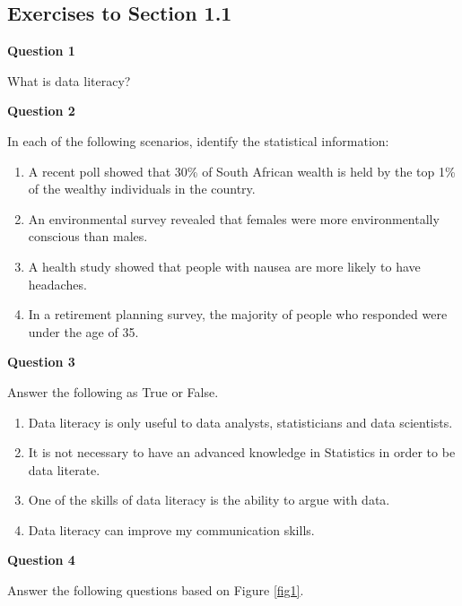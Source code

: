 \documentclass[
]{book}
\begin{document}
\subsection{Exercises to Section 1.1}\label{exercises-to-section-1.1}

\textbf{Question 1}

What is data literacy?

\textbf{Question 2}

In each of the following scenarios, identify the statistical information:

\begin{enumerate}
\def\labelenumi{\alph{enumi}.}
\item
  A recent poll showed that 30\% of South African wealth is held by the top 1\% of the wealthy individuals in the country.
\item
  An environmental survey revealed that females were more environmentally conscious than males.
\item
  A health study showed that people with nausea are more likely to have headaches.
\item
  In a retirement planning survey, the majority of people who responded were under the age of 35.
\end{enumerate}

\textbf{Question 3}

Answer the following as True or False.

\begin{enumerate}
\def\labelenumi{\alph{enumi}.}
\item
  Data literacy is only useful to data analysts, statisticians and data scientists.
\item
  It is not necessary to have an advanced knowledge in Statistics in order to be data literate.
\item
  One of the skills of data literacy is the ability to argue with data.
\item
  Data literacy can improve my communication skills.
\end{enumerate}

\textbf{Question 4}

Answer the following questions based on Figure \ref{fig1}.
\end{document}
